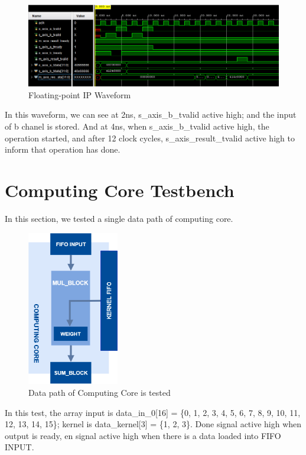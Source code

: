 \documentclass[a4paper, 12pt]{report}
\begin{document}
\begin{figure}[H]
    \centering
    \includegraphics[width = 16cm]{picture/result/float/waveformfloating.png}
    \caption{Floating-point IP Waveform}
    \medskip
\end{figure}

In this waveform, we can see at 2ns, s\_axis\_b\_tvalid active high; and the input of b chanel is stored. And at 4ns, when s\_axis\_b\_tvalid active high, the operation started, and after 12 clock cycles, s\_axis\_result\_tvalid active high to inform that operation has done.
\section{Computing Core Testbench}
In this section, we tested a single data path of computing core.

\begin{figure}[H]
    \centering
    \includegraphics[width = 4cm]{picture/result/computingcore/convo_dataflow-Page-3.drawio.png}
    \caption{Data path of Computing Core is tested}
    \medskip
\end{figure}

In this test, the array input is data\_in\_0[16] = \{0, 1, 2, 3, 4, 5, 6, 7, 8, 9, 10, 11, 12, 13, 14, 15\}; kernel is data\_kernel[3] = \{1, 2, 3\}. Done signal active high when output is ready, en signal active high when there is a data loaded into FIFO INPUT.
\end{document}
